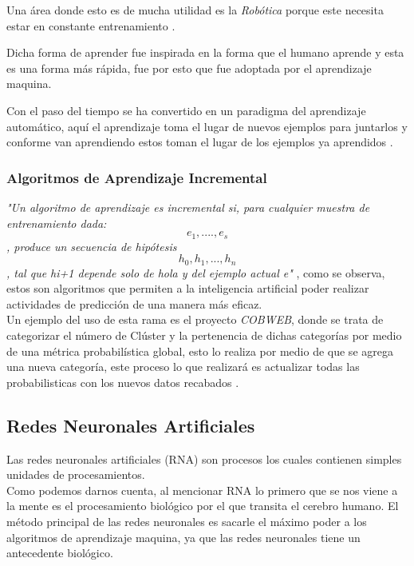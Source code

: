         Una área donde esto es de mucha utilidad es la \textit{Rob\'otica} porque este necesita estar en constante entrenamiento \cite{GiraudCarrier2000}.

        Dicha forma de aprender fue inspirada en la forma que el humano aprende y esta es una forma más rápida, fue por esto que fue adoptada 
        por el aprendizaje maquina.

        Con el paso del tiempo se ha convertido en un paradigma del aprendizaje automático, aquí el aprendizaje toma el lugar de nuevos ejemplos para juntarlos 
        y conforme van aprendiendo estos toman el lugar de los ejemplos ya aprendidos \cite{liu2015}.

        \subsubsection{Algoritmos de Aprendizaje Incremental}
            \textit{"Un algoritmo de aprendizaje es incremental si,
            para cualquier muestra de entrenamiento dada:
            \begin{equation}
                e_{1} , .... , e_{s}
			\end{equation}
            , produce un secuencia de hipótesis 
            \begin{equation}
                h_{0} , h_{1}, . . . , h_{n} 
            \end{equation}
            , tal que hi+1 depende solo de hola y del ejemplo actual e"} \cite{GiraudCarrier2000}, como se 
            observa, estos son algoritmos que permiten a la inteligencia artificial poder realizar actividades de predicci\'on 
            de una manera m\'as eficaz.\\
            Un ejemplo del uso de esta rama es el proyecto \textit{COBWEB}, donde se trata de categorizar el n\'umero de Cl\'uster y la pertenencia 
            de dichas categor\'ias por medio de una m\'etrica probabil\'istica global, esto lo realiza por medio de que se agrega 
            una nueva categor\'ia, este proceso lo que realizar\'a es actualizar todas las probabilisticas con los nuevos datos recabados \cite{fisher1987}.
    
    \subsection{Redes Neuronales Artificiales}
        
        Las redes neuronales artificiales (RNA) son procesos los cuales contienen simples unidades de procesamientos. \\
        Como podemos darnos cuenta, al mencionar RNA lo primero que se nos viene a la mente es el procesamiento biol\'ogico por el que transita el 
        cerebro humano. El m\'etodo principal de las redes neuronales es sacarle el máximo poder a los algoritmos de aprendizaje maquina, ya que las redes neuronales 
        tiene un antecedente biol\'ogico.

